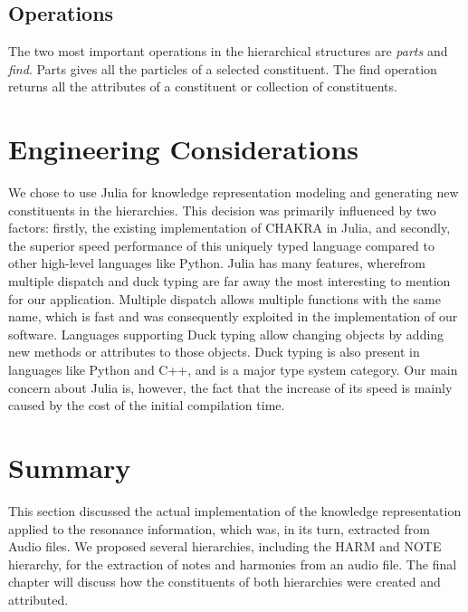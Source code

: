 \subsection{Operations}
The two most important operations in the hierarchical structures are \textit{parts} and \textit{find}. Parts gives all the particles of a selected constituent. The find operation returns all the attributes of a constituent or collection of constituents.

\section{Engineering Considerations}
We chose to use Julia for knowledge representation modeling and generating new constituents in the hierarchies. This decision was primarily influenced by two factors: firstly, the existing implementation of CHAKRA in Julia, and secondly, the superior speed performance of this uniquely typed language compared to other high-level languages like Python. Julia has many features, wherefrom multiple dispatch and duck typing are far away the most interesting to mention for our application. Multiple dispatch allows multiple functions with the same name, which is fast and was consequently exploited in the implementation of our software.
Languages supporting Duck typing allow changing objects by adding new methods or attributes to those objects. Duck typing is also present in languages like Python and C++, and is a major type system category. Our main concern about Julia is, however, the fact that the increase of its speed is mainly caused by the cost of the initial compilation time. 


\section{Summary}
This section discussed the actual implementation of the knowledge representation applied to the resonance information, which was, in its turn, extracted from Audio files. We proposed several hierarchies, including the HARM and NOTE hierarchy, for the extraction of notes and harmonies from an audio file. The final chapter will discuss how the constituents of both hierarchies were created and attributed.

